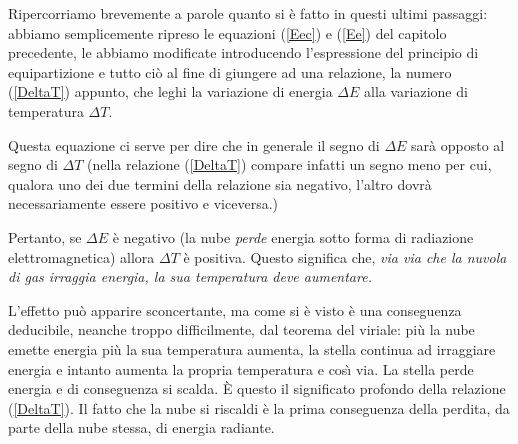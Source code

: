Ripercorriamo brevemente a parole quanto si \`{e} fatto in questi ultimi
passaggi: abbiamo semplicemente ripreso le equazioni (\ref{Eec}) e (\ref{Ee})
del capitolo precedente, le abbiamo modificate introducendo l'espressione del
principio di equipartizione e tutto ci\`o al fine di giungere ad una relazione, la numero (\ref{DeltaT}) appunto, che leghi la variazione di energia $\Delta E$ alla variazione di temperatura $\Delta T$. \par
Questa equazione ci serve per dire che in generale il segno di $\Delta E$ sar\`{a} opposto al segno di $\Delta T$ (nella relazione (\ref{DeltaT}) compare infatti un segno meno per cui, qualora uno dei due termini della relazione sia negativo, l'altro dovr\`{a} necessariamente essere positivo e viceversa.)
\par
Pertanto, se $\Delta E$ \`{e} negativo (la nube \emph{perde} energia sotto forma di radiazione elettromagnetica) allora $\Delta T$ \`{e} positiva.
Questo significa che, \emph{via via che la nuvola di gas irraggia energia, la sua temperatura deve aumentare.}
\par
L'effetto pu\`o apparire sconcertante, ma come si \`{e} visto \`{e} una conseguenza deducibile, neanche troppo difficilmente, dal teorema del viriale: pi\`{u} la nube emette energia pi\`{u} la sua temperatura aumenta, la stella continua ad irraggiare energia e intanto aumenta la propria temperatura e cos\`{\i}{} via.
La stella perde energia e di conseguenza si scalda. \`E questo il significato profondo della relazione (\ref{DeltaT}).
Il fatto che la nube si riscaldi \`{e} la prima conseguenza della perdita, da parte della nube stessa, di energia radiante.
